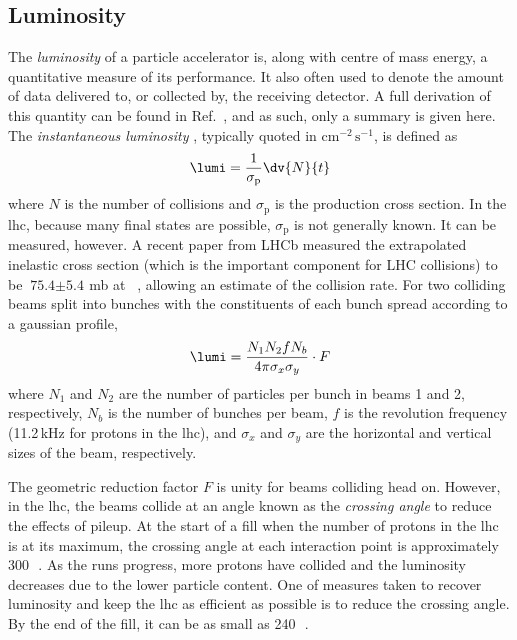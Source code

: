 



\subsection{Luminosity}
\label{subsec:luminosity}

The \emph{\gls{luminosity}} of a particle accelerator is, along with centre of mass energy, a quantitative measure of its performance. It also often used to denote the amount of data delivered to, or collected by, the receiving detector. A full derivation of this quantity can be found in Ref.~, and as such, only a summary is given here. The \emph{instantaneous luminosity} \lumi, typically quoted in $\text{cm}^{-2}\,\text{s}^{-1}$, is defined as
\begin{equation}
    \lumi = \frac{1}{\sigma_{\mathrm{p}}} \dv{N}{t}
    \label{eq:lumi_instantaneous}
\end{equation}
where $N$ is the number of collisions and $\sigma_{\mathrm{p}}$ is the production cross section. In the \acrshort{lhc}, because many final states are possible, $\sigma_{\mathrm{p}}$ is not generally known. It can be measured, however. A recent paper from LHCb measured the extrapolated inelastic cross section (which is the important component for LHC collisions) to be $\text{75.4} \pm \text{5.4}$\,mb at \comruntwo~\cite{Aaij:2018okq}, allowing an estimate of the collision rate. For two colliding beams split into bunches with the constituents of each bunch spread according to a gaussian profile,
\begin{equation}
    \lumi = \frac{N_1 N_2 f N_b}{4 \pi \sigma_x \sigma_y} \cdot F %
    \label{eq:lumi_inst_head_on_colliding_beams}
\end{equation}
where $N_1$ and $N_2$ are the number of particles per bunch in beams 1 and 2, respectively, $N_b$ is the number of bunches per beam, $f$ is the revolution frequency (11.2\,kHz for protons in the \acrshort{lhc}), and $\sigma_x$ and $\sigma_y$ are the horizontal and vertical sizes of the beam, respectively.

The geometric reduction factor $F$ is unity for beams colliding head on. However, in the \acrshort{lhc}, the beams collide at an angle known as the \emph{crossing angle} to reduce the effects of \gls{pileup}. At the start of a fill when the number of protons in the \acrshort{lhc} is at its maximum, the crossing angle at each interaction point is approximately 300\,\si{\micro{}}. As the runs progress, more protons have collided and the luminosity decreases due to the lower particle content. One of measures taken to recover luminosity and keep the \acrshort{lhc} as efficient as possible is to reduce the crossing angle. By the end of the fill, it can be as small as 240\,\si{\micro{}}.

